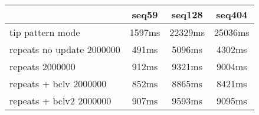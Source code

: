 \begin{tabular}{|l|c|c|c|}
\hline
 & seq59 & seq128 & seq404  \\
\hline
tip pattern mode &  1597ms &  22329ms &  25036ms\\
\hline
repeats no update 2000000 &  491ms &  5096ms &  4302ms\\
\hline
repeats 2000000 &  912ms &  9321ms &  9004ms\\
\hline
repeats + bclv 2000000 &  852ms &  8865ms &  8421ms\\
\hline
repeats + bclv2 2000000 &  907ms &  9593ms &  9095ms\\
\hline
\end{tabular}

